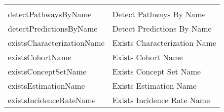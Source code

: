 \documentclass[
]{article}
\begin{document}
\begin{longtable}[]{@{}ll@{}}
\begin{minipage}[t]{0.48\columnwidth}
\end{minipage}\tabularnewline
\begin{minipage}[t]{0.46\columnwidth}\raggedright
detectPathwaysByName\strut
\end{minipage} & \begin{minipage}[t]{0.48\columnwidth}\raggedright
Detect Pathways By Name\strut
\end{minipage}\tabularnewline
\begin{minipage}[t]{0.46\columnwidth}\raggedright
detectPredictionsByName\strut
\end{minipage} & \begin{minipage}[t]{0.48\columnwidth}\raggedright
Detect Predictions By Name\strut
\end{minipage}\tabularnewline
\begin{minipage}[t]{0.46\columnwidth}\raggedright
existsCharacterizationName\strut
\end{minipage} & \begin{minipage}[t]{0.48\columnwidth}\raggedright
Exists Characterization Name\strut
\end{minipage}\tabularnewline
\begin{minipage}[t]{0.46\columnwidth}\raggedright
existsCohortName\strut
\end{minipage} & \begin{minipage}[t]{0.48\columnwidth}\raggedright
Exists Cohort Name\strut
\end{minipage}\tabularnewline
\begin{minipage}[t]{0.46\columnwidth}\raggedright
existsConceptSetName\strut
\end{minipage} & \begin{minipage}[t]{0.48\columnwidth}\raggedright
Exists Concept Set Name\strut
\end{minipage}\tabularnewline
\begin{minipage}[t]{0.46\columnwidth}\raggedright
existsEstimationName\strut
\end{minipage} & \begin{minipage}[t]{0.48\columnwidth}\raggedright
Exists Estimation Name\strut
\end{minipage}\tabularnewline
\begin{minipage}[t]{0.46\columnwidth}\raggedright
existsIncidenceRateName\strut
\end{minipage} & \begin{minipage}[t]{0.48\columnwidth}\raggedright
Exists Incidence Rate Name\strut
\end{minipage}\tabularnewline

\end{longtable}
\end{document}

